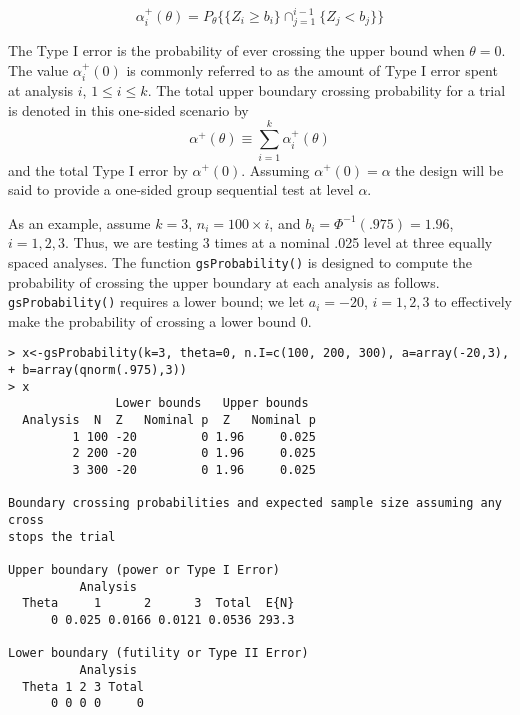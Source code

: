 \begin{equation}
\alpha_{i}^{+}(\theta)=P_{\theta}\{\{Z_{i}\geq b_{i}\}\cap_{j=1}^{i-1}%
\{Z_{j}<b_{j}\}\}\label{alphai+(theta)}%
\end{equation}

The Type I error is the probability of ever crossing the upper bound when $\theta=0$. The value $\alpha^+_{i}(0)$ is commonly referred to as the amount of 
Type I error spent at analysis $i$, $1\leq i\leq k$. The total upper boundary crossing probability for a trial is denoted in this one-sided scenario by 
\begin{equation}
\alpha^+(\theta) \equiv\sum_{i=1}^{k}\alpha^+_{i}(\theta)\label{alpha+(theta)}
\end{equation}
and the total Type I error by $\alpha^+(0)$.
Assuming $\alpha^+(0)=\alpha$ the design will be said to provide a one-sided group sequential test at level $\alpha$.

As an example, assume $k=3$, $n_i=100\times i$, and $b_i=\Phi^{-1}(.975)=1.96$, $i=1,2,3$. Thus, we are testing 3 times at a nominal .025 level at three equally spaced analyses. The function \texttt{gsProbability()} is designed to compute the probability of crossing the upper boundary at each analysis as follows. \texttt{gsProbability()} requires a lower bound; we let $a_i= -20$, $i=1,2,3$ to effectively make the probability of crossing a lower bound 0.
\bigskip
\begin{verbatim}
> x<-gsProbability(k=3, theta=0, n.I=c(100, 200, 300), a=array(-20,3),
+ b=array(qnorm(.975),3))
> x
               Lower bounds   Upper bounds
  Analysis  N  Z   Nominal p  Z   Nominal p
         1 100 -20         0 1.96     0.025
         2 200 -20         0 1.96     0.025
         3 300 -20         0 1.96     0.025

Boundary crossing probabilities and expected sample size assuming any cross
stops the trial

Upper boundary (power or Type I Error)
          Analysis
  Theta     1      2      3  Total  E{N}
      0 0.025 0.0166 0.0121 0.0536 293.3

Lower boundary (futility or Type II Error)
          Analysis
  Theta 1 2 3 Total
      0 0 0 0     0
\end{verbatim}

